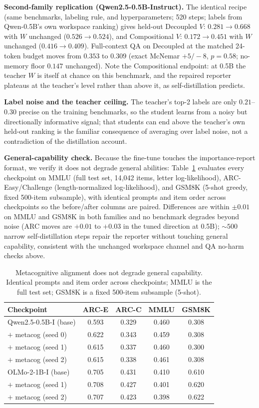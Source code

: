 \textbf{Second-family replication (Qwen2.5-0.5B-Instruct).} The identical
recipe (same benchmarks, labeling rule, and hyperparameters; 520 steps;
labels from Qwen-0.5B's own workspace ranking) gives held-out Decoupled
$V$: $0.281 \to 0.668$ with $W$ unchanged ($0.526 \to 0.524$), and
Compositional $V$: $0.172 \to 0.451$ with $W$ unchanged
($0.416 \to 0.409$). Full-context QA on Decoupled at the matched 24-token
budget moves from $0.353$ to $0.309$ (exact McNemar $+5/-8$, $p{=}0.58$;
no-memory floor $0.147$ unchanged). Note the Compositional endpoint: at 0.5B
the teacher $W$ is itself at chance on this benchmark, and the repaired
reporter plateaus at the teacher's level rather than above it, as
self-distillation predicts.

\textbf{Label noise and the teacher ceiling.} The teacher's top-2 labels are
only $0.21$--$0.30$ precise on the training benchmarks, so the student
learns from a noisy but directionally informative signal; that students can
end above the teacher's own held-out ranking is the familiar consequence of
averaging over label noise, not a contradiction of the distillation account.

\textbf{General-capability check.} Because the fine-tune touches the
importance-report format, we verify it does not degrade general abilities:
Table~\ref{tab:geneval} evaluates every checkpoint on MMLU (full test set,
14{,}042 items, letter log-likelihood), ARC-Easy/Challenge
(length-normalized log-likelihood), and GSM8K (5-shot greedy, fixed
500-item subsample), with identical prompts and item order across
checkpoints so the before/after columns are paired. Differences are within
$\pm 0.01$ on MMLU and GSM8K in both families and no benchmark degrades
beyond noise (ARC moves are $+0.01$ to $+0.03$ in the tuned direction at
0.5B); ${\sim}500$ narrow self-distillation steps repair the reporter
without touching general capability, consistent with the unchanged
workspace channel and QA no-harm checks above.

\begin{table}[h]
\centering
\caption{Metacognitive alignment does not degrade general capability.
Identical prompts and item order across checkpoints; MMLU is the full test
set; GSM8K is a fixed 500-item subsample (5-shot).}
\label{tab:geneval}
\small
\begin{tabular}{lcccc}
\toprule
Checkpoint & ARC-E & ARC-C & MMLU & GSM8K \\
\midrule
{} Qwen2.5-0.5B-I (base) & 0.593 & 0.329 & 0.460 & 0.308 \\
\quad $+$ metacog (seed 0) & 0.622 & 0.343 & 0.459 & 0.308 \\
\quad $+$ metacog (seed 1) & 0.615 & 0.337 & 0.460 & 0.300 \\
\quad $+$ metacog (seed 2) & 0.615 & 0.338 & 0.461 & 0.308 \\
\addlinespace
{} OLMo-2-1B-I (base) & 0.705 & 0.431 & 0.410 & 0.610 \\
\quad $+$ metacog (seed 1) & 0.708 & 0.427 & 0.401 & 0.620 \\
\quad $+$ metacog (seed 2) & 0.707 & 0.423 & 0.398 & 0.622 \\
\bottomrule
\end{tabular}
\end{table}

